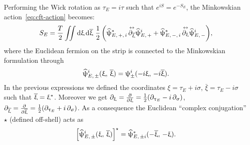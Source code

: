 Performing the Wick rotation as $\tau_E = i \tau$ such that $e^{i S} = e^{-S_E}$, the Minkowskian action~\eqref{eq:cft-action} becomes:
\begin{equation}
  S_E
  =
  \frac{T}{2}
  \iint \dd{\ensuremath{\upxi}} \dd{\ensuremath{\overline{\upxi}}}\,
  \frac{1}{2}\,
  \qty(
    \widehat{\uppsi}_{E,\, +,\, i}^*\, \overset{\leftrightarrow}{\partial_{\overline{\upxi}}} \widehat{\uppsi}_{E,\, +}^i
    +
    \widehat{\uppsi}_{E,\, -,\, i}^*\, \overset{\leftrightarrow}{\partial_{\upxi}} \widehat{\uppsi}_{E,\, -}^i
  ),
  \label{eq:S_Eu_strip}
\end{equation}
where the Euclidean fermion on the strip is connected to the Minkowskian formulation through
\begin{equation}
  \widehat{\uppsi}_{E,\, \pm}^i( \upxi,\, \overline{\upxi} )
  =
  \uppsi_{\pm}^i( -i\upxi,\, -i\overline{\upxi} ).
\end{equation}
In the previous expressions we defined the coordinates $\xi = \tau_E + i \sigma$, $\bar \xi = \tau_E - i \sigma$ such that $\overline{\upxi} = \upxi^*$.
Moreover we get $\partial_{\upxi} = \pdv{\ensuremath{\upxi}} = \frac{1}{2} \qty( \partial_{\uptau_E} - i\, \partial_{\upsigma} )$, $\partial_{\overline{\upxi}} = \pdv{\ensuremath{\overline{\upxi}}} = \frac{1}{2} \qty( \partial_{\uptau_E} + i\, \partial_{\upsigma} )$.
As a consequence the Euclidean ``complex conjugation'' $\star$ (defined off-shell) acts as
\begin{equation}
  \qty[
    \widehat{\uppsi}_{E,\, \pm}^i(\upxi,\, \overline{\upxi})
  ]^\star
  =
  \widehat{\uppsi}_{E,\, \pm i}^*(-\overline{\upxi},\, -\upxi).
  \label{eq:off-shell-Hermitian-conjugate}
\end{equation}

